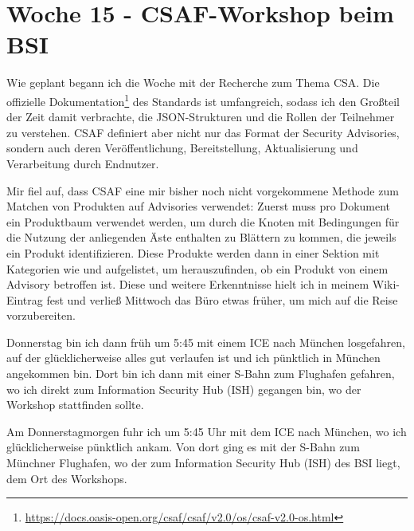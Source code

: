 \section{Woche 15 - CSAF-Workshop beim BSI} \label{sec:bericht-wo-15}


\lweekdaymarginpar{\weekdayMondayShort, \weekdayTuesdayShort, \weekdayWednesdayShort}

Wie geplant begann ich die Woche mit der Recherche zum Thema CSA\@.
Die offizielle Dokumentation\footnote{\url{https://docs.oasis-open.org/csaf/csaf/v2.0/os/csaf-v2.0-os.html}} des Standards ist umfangreich, sodass ich den Großteil der Zeit damit verbrachte, die JSON-Strukturen und die Rollen der Teilnehmer zu verstehen.
CSAF definiert aber nicht nur das Format der Security Advisories, sondern auch deren Veröffentlichung, Bereitstellung, Aktualisierung und Verarbeitung durch Endnutzer.

Mir fiel auf, dass CSAF eine mir bisher noch nicht vorgekommene Methode zum Matchen von Produkten auf Advisories verwendet:
Zuerst muss pro Dokument ein Produktbaum verwendet werden, um durch die Knoten mit Bedingungen für die Nutzung der anliegenden Äste enthalten zu Blättern zu kommen, die jeweils ein Produkt identifizieren.
Diese Produkte werden dann in einer Sektion mit Kategorien wie  und  aufgelistet, um herauszufinden, ob ein Produkt von einem Advisory betroffen ist.
Diese und weitere Erkenntnisse hielt ich in meinem Wiki-Eintrag fest und verließ Mittwoch das Büro etwas früher, um mich auf die Reise vorzubereiten.

\sweekdaymarginpar{\weekdayThursdayLong}

Donnerstag bin ich dann früh um 5:45 mit einem ICE nach München losgefahren, auf der glücklicherweise alles gut verlaufen ist und ich pünktlich in München angekommen bin.
Dort bin ich dann mit einer S-Bahn zum Flughafen gefahren, wo ich direkt zum Information Security Hub (ISH) gegangen bin, wo der Workshop stattfinden sollte.

Am Donnerstagmorgen fuhr ich um 5:45 Uhr mit dem ICE nach München, wo ich glücklicherweise pünktlich ankam.
Von dort ging es mit der S-Bahn zum Münchner Flughafen, wo der zum Information Security Hub (ISH) des BSI liegt, dem Ort des Workshops.

